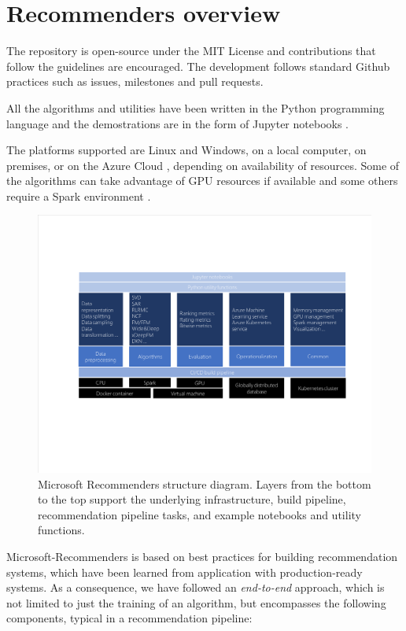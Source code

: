 \section{Recommenders overview}

The repository is open-source under the MIT License and contributions that follow the guidelines are encouraged.  
The development follows standard Github practices such as issues, milestones and pull requests.

All the algorithms and utilities have been written in the Python programming language and the demostrations are 
in the form of Jupyter notebooks \cite{jupyter}.

The platforms supported are Linux and Windows, on a local computer, on premises, or on the Azure Cloud \cite{azure}, depending on availability of resources.
Some of the algorithms can take advantage of GPU resources if available and some others require a Spark environment \cite{spark}.

\begin{figure}
  \centering
  \includegraphics[width=\textwidth,keepaspectratio]{platform_diagram_crop.pdf}
  \caption{Microsoft Recommenders structure diagram. Layers from the bottom to the top support the underlying infrastructure, build pipeline, recommendation pipeline tasks, and example notebooks and utility functions.}
\end{figure}

Microsoft-Recommenders is based on best practices for building recommendation systems, which have been learned from application with production-ready systems.
As a consequence, we have followed an {\em end-to-end} approach, which is not limited to just the training of an algorithm, but encompasses the following components, typical in a recommendation pipeline:


